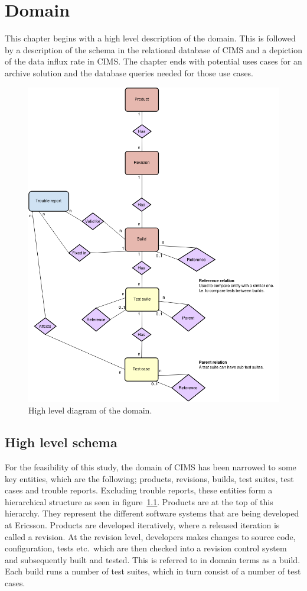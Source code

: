 \chapter{Domain}
\label{chap:domain}

This chapter begins with a high level description of the domain. This is followed by a description of the schema in the relational database of CIMS and a depiction of the data influx rate in CIMS. The chapter ends with potential uses cases for an archive solution and the database queries needed for those use cases.
\begin{figure}[h!]
\centering
\includegraphics[scale=0.45]{figure/er_diagram.png}
\caption{High level diagram of the domain.}
\label{fig:er}
\end{figure}

\section{High level schema}
For the feasibility of this study, the domain of CIMS has been narrowed to some key entities, which are the following; products, revisions, builds, test suites, test cases and trouble reports. Excluding trouble reports, these entities form a hierarchical structure as seen in figure~\ref{fig:er}. Products are at the top of this hierarchy. They represent the different software systems that are being developed at Ericsson. Products are developed iteratively, where a released iteration is called a revision. At the revision level, developers makes changes to source code, configuration, tests etc.\ which are then checked into a revision control system and subsequently built and tested. This is referred to in domain terms as a build. Each build runs a number of test suites, which in turn consist of a number of test cases.

